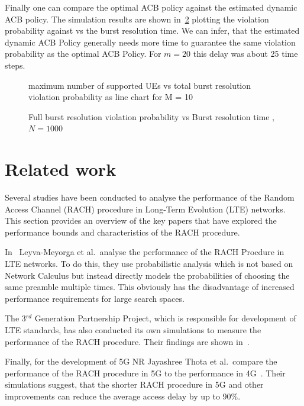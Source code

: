 \documentclass[conference]{IEEEtran}
\begin{document}
Finally one can compare the optimal ACB policy against the estimated dynamic ACB policy.
The simulation results are shown in~\ref{fig:5} plotting the violation probability against vs the burst resolution time.
We can infer, that the estimated dynamic ACB Policy generally needs more time to guarantee the same violation probability as the optimal ACB Policy.
For $m = 20$ this delay was about 25 time steps.
\begin{figure}
\resizebox{\columnwidth}{!}{}
    \caption{maximum number of supported UEs vs total burst resolution violation probability as line chart for M = {10}}\label{fig:max UEs supported}
\end{figure}
\begin{figure}
\resizebox{\columnwidth}{!}{}
    \caption{Full burst resolution violation probability vs Burst resolution time , $N= 1000$}\label{fig:5}
\end{figure}

\section{Related work}\label{relatedwork}
Several studies have been conducted to analyse the performance of the Random Access Channel (RACH) procedure in Long-Term Evolution (LTE) networks.
This section provides an overview of the key papers that have explored the performance bounds and characteristics of the RACH procedure.

In~\cite{leyva2017accurate} Leyva-Meyorga et al.\ analyse the performance of the RACH Procdure in LTE networks.
To do this, they use probabilistic analysis which is not based on Network Calculus but instead directly models the probabilities of choosing the same preamble multiple times.
This obviously has the disadvantage of increased performance requirements for large search spaces.

The  3$^{rd}$ Generation Partnership Project, which is responsible for development of LTE standards, has also conducted its own simulations to measure the performance of the RACH procedure.
Their findings are shown in~\cite{3GPP_TR_37.868}.

Finally, for the development of 5G NR Jayashree Thota et al.\ compare the performance of the RACH procedure in 5G to the performance in 4G~\cite{thota2019performance}.
Their simulations suggest, that the shorter RACH procedure in 5G and other improvements can reduce the average access delay by up to 90\%.
\end{document}
